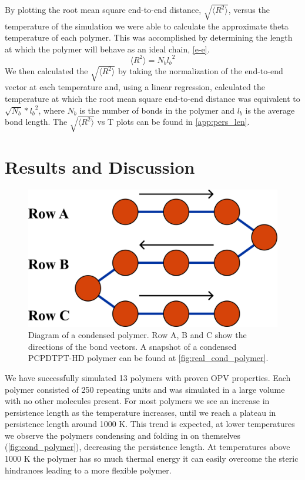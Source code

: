 By plotting the root mean square end-to-end distance, $\sqrt{\langle R^2\rangle}$, versus the temperature of the simulation we were able to calculate the approximate theta temperature of each polymer. This was accomplished by determining the length at which the polymer will behave as an ideal chain, \autoref{e-e}. 
\begin{equation}
    \langle R^2 \rangle = N_{b}{l_b}^2
    \label{e-e}
\end{equation}
We then calculated the $\sqrt{\langle R^2\rangle}$ by taking the normalization of the end-to-end vector at each temperature and, using a linear regression, calculated the temperature at which the root mean square end-to-end distance was equivalent to $\sqrt{N_b}*{l_b}^2$, where $N_b$ is the number of bonds in the polymer and $l_b$ is the average bond length. The $\sqrt{\langle R^2\rangle}$ vs T plots can be found in \autoref{app:pers_len}. 
\section{Results and Discussion}
\begin{figure}[b]
    \centering
    \includegraphics[width=0.5\linewidth]{src/figures/pers_l_figs/condensed_polymer.png}
    \caption{Diagram of a condensed polymer. Row A, B and C show the directions of the bond vectors. A snapshot of a condensed PCPDTPT-HD polymer can be found at \autoref{fig:real_cond_polymer}.}
    \label{fig:cond_polymer}
\end{figure}
We have successfully simulated 13 polymers with proven OPV properties. Each polymer consisted of 250 repeating units and was simulated in a large volume with no other molecules present. For most polymers we see an increase in persistence length as the temperature increases, until we reach a plateau in persistence length around 1000 K. This trend is expected, at lower temperatures we observe the polymers condensing and folding in on themselves (\autoref{fig:cond_polymer}), decreasing the persistence length. At temperatures above 1000 K the polymer has so much thermal energy it can easily overcome the steric hindrances leading to a more flexible polymer. 
